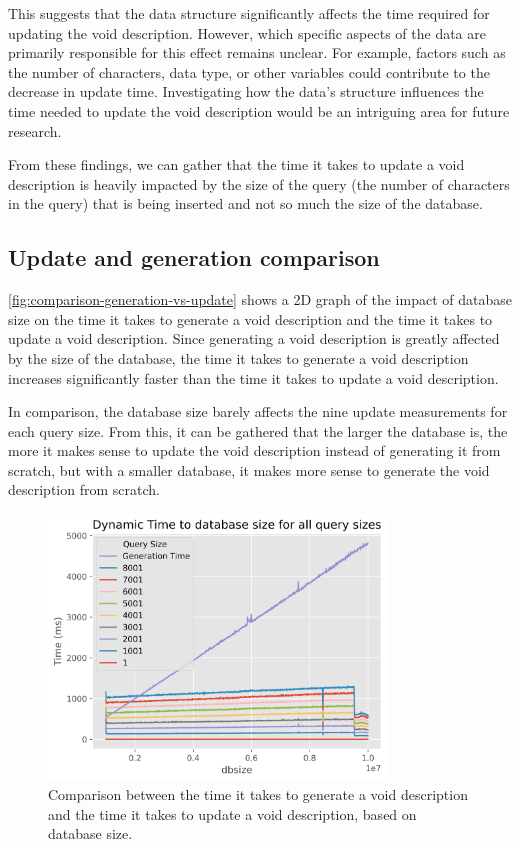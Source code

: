 This suggests that the data structure significantly affects the time required for updating the \gls{void} description. However, which specific aspects of the data are primarily responsible for this effect remains unclear. For example, factors such as the number of characters, data type, or other variables could contribute to the decrease in update time. Investigating how the data's structure influences the time needed to update the \gls{void} description would be an intriguing area for future research.

From these findings, we can gather that the time it takes to update a \gls{void} description is heavily impacted by the size of the query (the number of characters in the query) that is being inserted and not so much the size of the database.


\subsection{Update and generation comparison}\label{subsec:update-generation-comparison}
\autoref{fig:comparison-generation-vs-update} shows a 2D graph of the impact of database size on the time it takes to generate a \gls{void} description and the time it takes to update a \gls{void} description. Since generating a \gls{void} description is greatly affected by the size of the database, the time it takes to generate a \gls{void} description increases significantly faster than the time it takes to update a \gls{void} description.

In comparison, the database size barely affects the nine update measurements for each query size. From this, it can be gathered that the larger the database is, the more it makes sense to update the \gls{void} description instead of generating it from scratch, but with a smaller database, it makes more sense to generate the \gls{void} description from scratch.

\begin{figure}[t]
    \centering
    \includegraphics[width=0.8\textwidth]{figures/comparison-Generation-vs-Update.png}
    \caption{Comparison between the time it takes to generate a \gls{void} description and the time it takes to update a \gls{void} description, based on database size.}
    \label{fig:comparison-generation-vs-update}
\end{figure}

